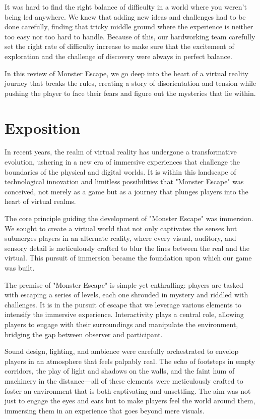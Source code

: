 \documentclass{vgtc}                          %
\begin{document}
It was hard to find the right balance of difficulty in a world where you weren't being led anywhere. We knew that adding new ideas and challenges had to be done carefully, finding that tricky middle ground where the experience is neither too easy nor too hard to handle. Because of this, our hardworking team carefully set the right rate of difficulty increase to make sure that the excitement of exploration and the challenge of discovery were always in perfect balance.

In this review of Monster Escape, we go deep into the heart of a virtual reality journey that breaks the rules, creating a story of disorientation and tension while pushing the player to face their fears and figure out the mysteries that lie within.



\section{Exposition}

In recent years, the realm of virtual reality has undergone a transformative evolution, ushering in a new era of immersive experiences that challenge the boundaries of the physical and digital worlds. It is within this landscape of technological innovation and limitless possibilities that "Monster Escape" was conceived, not merely as a game but as a journey that plunges players into the heart of virtual realms.

The core principle guiding the development of "Monster Escape" was immersion. We sought to create a virtual world that not only captivates the senses but submerges players in an alternate reality, where every visual, auditory, and sensory detail is meticulously crafted to blur the lines between the real and the virtual. This pursuit of immersion became the foundation upon which our game was built.

The premise of "Monster Escape" is simple yet enthralling: players are tasked with escaping a series of levels, each one shrouded in mystery and riddled with challenges. It is in the pursuit of escape that we leverage various elements to intensify the immersive experience. Interactivity plays a central role, allowing players to engage with their surroundings and manipulate the environment, bridging the gap between observer and participant.

Sound design, lighting, and ambience were carefully orchestrated to envelop players in an atmosphere that feels palpably real. The echo of footsteps in empty corridors, the play of light and shadows on the walls, and the faint hum of machinery in the distance—all of these elements were meticulously crafted to foster an environment that is both captivating and unsettling. The aim was not just to engage the eyes and ears but to make players feel the world around them, immersing them in an experience that goes beyond mere visuals.
\end{document}
